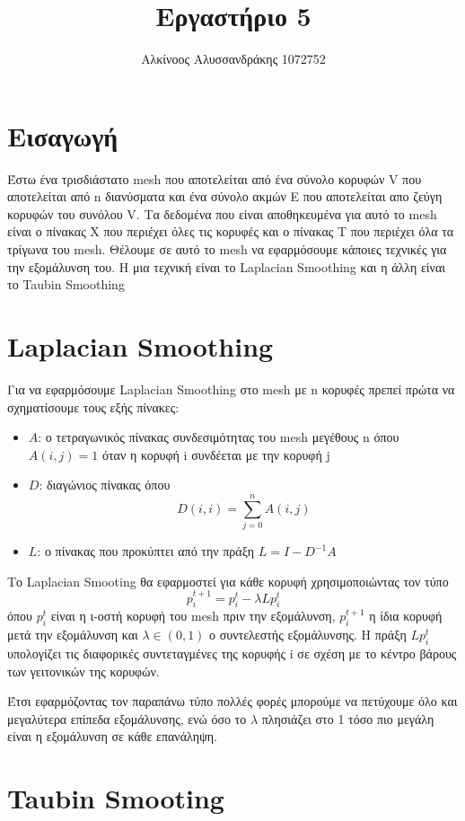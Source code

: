 \documentclass{article}
\title{Εργαστήριο 5}
\author{Αλκίνοος Αλυσσανδράκης 1072752}
\date{}
\begin{document}
\maketitle

\section{Εισαγωγή}
Έστω ένα τρισδιάστατο mesh που αποτελείται από ένα σύνολο κορυφών V που αποτελείται από
n διανύσματα και ένα σύνολο ακμών E που αποτελείται απο ζεύγη κορυφών του συνόλου V.
Τα δεδομένα που είναι αποθηκευμένα για αυτό το mesh είναι ο πίνακας X που περιέχει όλες
τις κορυφές και ο πίνακας T που περιέχει όλα τα τρίγωνα του mesh.
Θέλουμε σε αυτό το mesh να εφαρμόσουμε κάποιες τεχνικές για την εξομάλυνση του. Η μια
τεχνική είναι το Laplacian Smoothing και η άλλη είναι το Taubin Smoothing

\section{Laplacian Smoothing}
Για να εφαρμόσουμε Laplacian Smoothing στο mesh με n κορυφές πρεπεί πρώτα να σχηματίσουμε
τους εξής πίνακες:

\begin{itemize}
	\item $A$: ο τετραγωνικός πίνακας συνδεσιμότητας του mesh μεγέθους n
		όπου $A(i,j) = 1$ όταν η κορυφή i συνδέεται με την κορυφή j
	\item $D$: διαγώνιος πίνακας όπου \[D(i,i) = \sum_{j=0}^{n} A(i, j)\]
	\item $L$: ο πίνακας που προκύπτει από την πράξη $L = I - D^{-1}A$
\end{itemize}

\noindent
Το Laplacian Smooting θα εφαρμοστεί για κάθε κορυφή χρησιμοποιώντας τον τύπο
\[p_i^{t+1} = p_i^{t} - \lambda Lp_i^{t}\]
όπου $p_i^{t}$ είναι η ι-οστή κορυφή του mesh πριν την εξομάλυνση, $p_i^{t+1}$ η ίδια
κορυφή μετά την εξομάλυνση και $\lambda \in (0, 1)$ ο συντελεστής εξομάλυνσης.
Η πράξη $Lp_i^{t}$ υπολογίζει τις διαφορικές συντεταγμένες της κορυφής i σε σχέση με το
κέντρο βάρους των γειτονικών της κορυφών.

Έτσι εφαρμόζοντας τον παραπάνω τύπο πολλές φορές μπορούμε να πετύχουμε όλο και μεγαλύτερα
επίπεδα εξομάλυνσης, ενώ όσο το $\lambda$ πλησιάζει στο 1 τόσο πιο μεγάλη είναι η
εξομάλυνση σε κάθε επανάληψη.


\section{Taubin Smooting}
\end{document}

